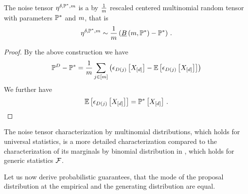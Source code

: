 \begin{theorem}
    \label{the:multinomialEmpdistFluctuation}
    The noise tensor $\eta^{\delta,\mathbb{P}^*,m}$ is a by $\frac{1}{m}$ rescaled centered multinomial random tensor with parameters $\mathbb{P}^*$ and $m$, that is
    \begin{align*}
        \eta^{\delta,\mathbb{P}^*,m} \sim \frac{1}{m} \left( \underline{B}\left(m,\mathbb{P}^*\right) - \mathbb{P}^* \right) \, .
    \end{align*}
\end{theorem}
\begin{proof}
    By the above construction we have
    \begin{align*}
        \mathbb{P}^{D} - \mathbb{P}^*
        = \frac{1}{m}\sum_{j\in[m]} \left( \epsilon_{D(j)}\left[X_{[d]}\right] - \mathbb{E}\left[\epsilon_{D(j)}\left[X_{[d]}\right]\right] \right)
    \end{align*}
    We further have
    \begin{align*}
        \mathbb{E}\left[\epsilon_{D(j)}\left[X_{[d]}\right]\right] = \mathbb{P}^*\left[X_{[d]}\right] \, .
    \end{align*}
\end{proof}

The noise tensor characterization by multinomial distributions, which holds for universal statistics, is a more detailed characterization compared to the characterization of its marginals by binomial distribution in , which holds for generic statistics $\mathcal{F}$.


Let us now derive probabilistic guarantees, that the mode of the proposal distribution at the empirical and the generating distribution are equal.

